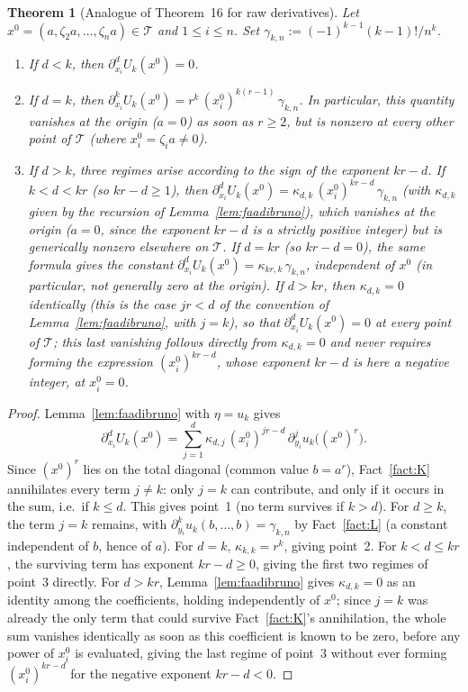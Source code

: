 \documentclass[11pt]{article}
\newtheorem{theorem}{Theorem}[section]
\theoremstyle{remark}
\begin{document}
\begin{theorem}[Analogue of Theorem~16 for raw derivatives]\label{thm:16brut}
Let $x^0=(a,\zeta_2a,\dots,\zeta_na)\in\mathcal T$ and $1\le i\le n$. Set $\gamma_{k,n}:=(-1)^{k-1}(k-1)!/n^k$.
\begin{enumerate}
\item If $d<k$, then $\partial_{x_i}^d U_k(x^0)=0$.
\item If $d=k$, then $\partial_{x_i}^k U_k(x^0) = r^k\,(x_i^0)^{k(r-1)}\,\gamma_{k,n}$. In particular, this quantity vanishes at the origin ($a=0$) as soon as $r\ge2$, but is nonzero at every other point of $\mathcal T$ (where $x_i^0=\zeta_ia\ne0$).
\item If $d>k$, three regimes arise according to the sign of the exponent $kr-d$. If $k<d<kr$ (so $kr-d\ge1$), then $\partial_{x_i}^dU_k(x^0) = \kappa_{d,k}\,(x_i^0)^{kr-d}\,\gamma_{k,n}$ (with $\kappa_{d,k}$ given by the recursion of Lemma~\ref{lem:faadibruno}), which vanishes at the origin ($a=0$, since the exponent $kr-d$ is a strictly positive integer) but is generically nonzero elsewhere on $\mathcal T$. If $d=kr$ (so $kr-d=0$), the same formula gives the constant $\partial_{x_i}^dU_k(x^0) = \kappa_{kr,k}\,\gamma_{k,n}$, independent of $x^0$ (in particular, not generally zero at the origin). If $d>kr$, then $\kappa_{d,k}=0$ \emph{identically} (this is the case $jr<d$ of the convention of Lemma~\ref{lem:faadibruno}, with $j=k$), so that $\partial_{x_i}^dU_k(x^0)=0$ at \emph{every} point of $\mathcal T$; this last vanishing follows directly from $\kappa_{d,k}=0$ and never requires forming the expression $(x_i^0)^{kr-d}$, whose exponent $kr-d$ is here a negative integer, at $x_i^0=0$.
\end{enumerate}
\end{theorem}

\begin{proof}
Lemma~\ref{lem:faadibruno} with $\eta=u_k$ gives
\[
\partial_{x_i}^dU_k(x^0) = \sum_{j=1}^d \kappa_{d,j}\,(x_i^0)^{jr-d}\,\partial_{y_i}^ju_k\big((x^0)^r\big).
\]
Since $(x^0)^r$ lies on the total diagonal (common value $b=a^r$), Fact~\ref{fact:K} annihilates every term $j\ne k$: only $j=k$ can contribute, and only if it occurs in the sum, i.e.\ if $k\le d$. This gives point~1 (no term survives if $k>d$). For $d\ge k$, the term $j=k$ remains, with $\partial_{y_i}^ku_k(b,\dots,b)=\gamma_{k,n}$ by Fact~\ref{fact:L} (a constant independent of $b$, hence of $a$). For $d=k$, $\kappa_{k,k}=r^k$, giving point~2. For $k<d\le kr$, the surviving term has exponent $kr-d\ge0$, giving the first two regimes of point~3 directly. For $d>kr$, Lemma~\ref{lem:faadibruno} gives $\kappa_{d,k}=0$ as an identity among the coefficients, holding independently of $x^0$; since $j=k$ was already the only term that could survive Fact~\ref{fact:K}'s annihilation, the whole sum vanishes identically as soon as this coefficient is known to be zero, before any power of $x_i^0$ is evaluated, giving the last regime of point~3 without ever forming $(x_i^0)^{kr-d}$ for the negative exponent $kr-d<0$.
\end{proof}
\end{document}
